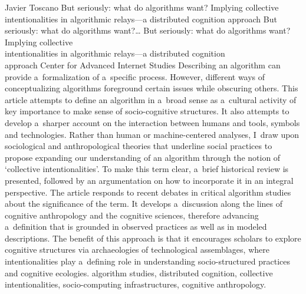 \begin{artengenv}{Javier Toscano}
	{But seriously: what do algorithms want? Implying collective intentionalities in algorithmic relays---a distributed cognition approach}
	{But seriously: what do algorithms want?\ldots}
	{But seriously: what do algorithms want? Implying collective\\intentionalities in algorithmic relays---a distributed cognition\\approach}
	{Center for Advanced Internet Studies}
	{Describing an algorithm can provide a~formalization of a~specific process. However, different ways of conceptualizing algorithms foreground certain issues while obscuring others. This article attempts to define an algorithm in a~broad sense as a~cultural activity of key importance to make sense of socio-cognitive structures. It also attempts to develop a~sharper account on the interaction between humans and tools, symbols and technologies. Rather than human or machine-centered analyses, I~draw upon sociological and anthropological theories that underline social practices to propose expanding our understanding of an algorithm through the notion of ‘collective intentionalities'. To make this term clear, a~brief historical review is presented, followed by an argumentation on how to incorporate it in an integral perspective. The article responds to recent debates in critical algorithm studies about the significance of the term. It develops a~discussion along the lines of cognitive anthropology and the cognitive sciences, therefore advancing a~definition that is grounded in observed practices as well as in modeled descriptions. The benefit of this approach is that it encourages scholars to explore cognitive structures via archaeologies of technological assemblages, where intentionalities play a~defining role in understanding socio-structured practices and cognitive ecologies.
	}
	{algorithm studies, distributed cognition, collective intentionalities, socio-computing infrastructures, cognitive anthropology.}
	

\end{artengenv}
